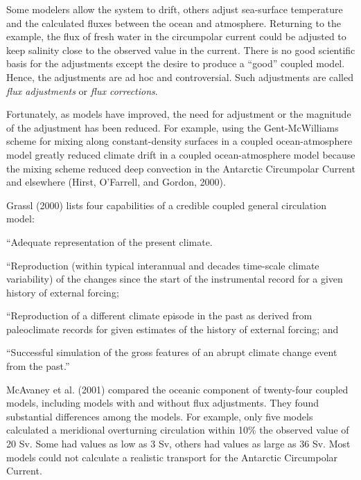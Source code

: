 Some modelers allow the system to drift, others adjust sea-surface
temperature and the calculated fluxes between the ocean and
atmosphere. Returning to the example, the flux of fresh water in the
circumpolar current could be adjusted to keep salinity close to the
observed value in the current. There is no good scientific basis for
the adjustments except the desire to produce a ``good'' coupled
model. Hence, the adjustments are ad hoc and controversial. Such
adjustments are called \textit{flux adjustments} or \textit{flux corrections}.

Fortunately, as models have improved, the need for adjustment or the
magnitude of the adjustment has been reduced. For example, using the
Gent-McWilliams scheme for mixing along constant-density surfaces in a
coupled ocean-atmosphere model greatly reduced climate drift in a
coupled ocean-atmos\-phere model because the mixing scheme reduced deep convection in the Antarctic
Circumpolar Current and elsewhere (Hirst, O'Farrell, and Gordon, 2000).

Grassl (2000) lists four capabilities of a credible coupled general
circulation model:
\begin{enumerate}
\vitem ``Adequate representation of the present climate.

\vitem ``Reproduction (within typical interannual and decades
time-scale climate variability) of the changes since the start of the
instrumental record for a given history of external forcing;

\vitem ``Reproduction of a different climate episode in the past as
derived from paleoclimate records for given estimates of the history
of external forcing; and

\vitem ``Successful simulation of the gross features of an abrupt
climate change event from the past.''
\end{enumerate}

McAvaney et al. (2001) compared the oceanic component of twenty-four
coupled models, including models with and without flux
adjustments. They
found substantial differences among the models. For example, only five
models calculated a meridional overturning
circulation within 10\% the
observed value of 20 Sv. Some had values as low as 3 Sv, others had values as
large as 36 Sv. Most models could not calculate a realistic
transport for the
Antarctic Circumpolar Current.

